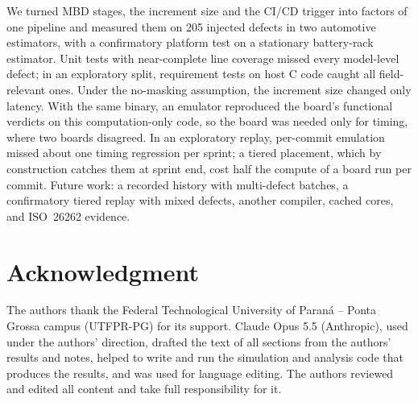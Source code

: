\documentclass[conference]{IEEEtran}
\begin{document}
We turned MBD stages, the increment size and the CI/CD trigger into factors of one pipeline and measured
them on 205 injected defects in two automotive estimators, with a confirmatory platform test on a stationary
battery-rack estimator.
Unit tests with near-complete line coverage missed every model-level defect; in an exploratory split,
requirement tests on host C code caught all field-relevant ones. Under the no-masking assumption, the
increment size changed only latency. With the same binary, an emulator reproduced the board's functional
verdicts on this computation-only code, so the board was needed only for timing, where two boards disagreed. In an exploratory replay, per-commit
emulation missed about one timing regression per sprint; a tiered placement, which by construction catches
them at sprint end, cost half the compute of a board run per commit. Future work: a recorded history with
multi-defect batches, a confirmatory tiered replay with mixed defects, another compiler, cached cores, and
ISO~26262 evidence.

\section*{Acknowledgment}
The authors thank the Federal Technological University of Paran\'a -- Ponta Grossa campus (UTFPR-PG) for its
support. Claude Opus 5.5 (Anthropic), used under the authors' direction, drafted the text of all sections
from the authors' results and notes, helped to write and run the simulation and analysis code that produces the results, and was used
for language editing. The authors reviewed and edited all content and take full responsibility for it.



\end{document}
